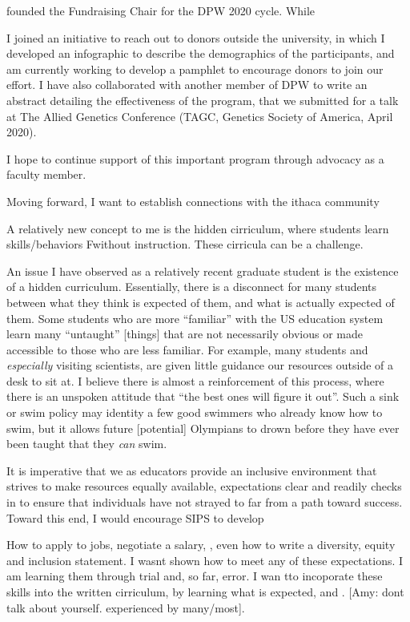 \documentclass[11pt]{article}
\begin{document}
founded the Fundraising Chair for the DPW 2020 cycle. While 

I joined an initiative to reach out to donors outside the university, in which I developed an infographic to describe the demographics of the participants, and am currently working to develop a pamphlet to encourage donors to join our effort. I have also collaborated with another member of DPW to write an abstract detailing the effectiveness of the program, that we submitted for a talk at The Allied Genetics Conference (TAGC, Genetics Society of America, April 2020).

I hope to continue support of this important program through advocacy as a faculty member.  

Moving forward, I want to establish connections with the ithaca community 


A relatively new concept to me is the hidden cirriculum, where students learn skills/behaviors Fwithout instruction. These cirricula can be a challenge. 

An issue I have observed as a relatively recent graduate student is the existence of a hidden curriculum. Essentially, there is a disconnect for many students between what they think is expected of them, and what is actually expected of them. Some students who are more ``familiar'' with the US education system learn many ``untaught'' [things] that are not necessarily obvious or made accessible to those who are less familiar. For example, many students and \emph{especially} visiting scientists, are given little guidance our resources outside of a desk to sit at. I believe there is almost a reinforcement of this process, where there is an unspoken attitude that ``the best ones will figure it out''. Such a sink or swim policy may identity a few good swimmers who already know how to swim, but it allows future [potential] Olympians to drown before they have ever been taught that they \emph{can} swim. 

It is imperative that we as educators provide an inclusive environment that strives to make resources equally available, expectations clear and readily checks in to ensure that individuals have not strayed to far from a path toward success. Toward this end, I would encourage SIPS to develop 

How to apply to jobs, negotiate a salary, , even how to write a diversity, equity and inclusion statement. I wasnt shown how to meet any of these expectations. I am learning them through trial and, so far, error. I wan tto incoporate these skills into the written cirriculum, by learning what is expected, and . [Amy: dont talk about yourself. experienced by many/most]. 
\end{document}
